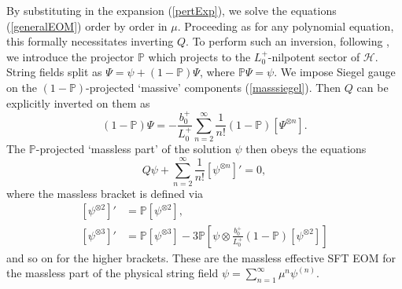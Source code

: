 \documentclass[12pt]{article}
\def\be{\begin{equation}}
\def\ee{\end{equation}}
\numberwithin{equation}{section}
\begin{document}
By substituting in the expansion (\ref{pertExp}), we solve the equations (\ref{generalEOM}) order by order in $\mu$. Proceeding as for any polynomial equation, this formally necessitates inverting $Q$. To perform such an inversion, following \cite{Erbin:2020eyc}, we introduce the projector $\mathbb{P}$ which projects to the $L_0^+$-nilpotent sector of $\mathcal{H}$. String fields split as $\Psi = \psi + (1-\mathbb{P})\Psi$, where $\mathbb{P} \Psi = \psi$. We impose Siegel gauge on the $(1-\mathbb{P})$-projected `massive' components (\ref{masssiegel}). Then $Q$ can be explicitly inverted on them as
\be\label{massivesf}
(1-\mathbb{P})\Psi = -\frac{b_0^+}{L_0^+}\sum\limits_{n=2}^\infty \frac{1}{n!}(1-\mathbb{P})[\Psi^{\otimes n}].
\ee
The $\mathbb{P}$-projected `massless part' of the solution $\psi$ then obeys the equations
\be\label{masslesseom}
Q \psi + \sum\limits_{n=2}^\infty \frac{1}{n!}[\psi^{\otimes n}]' = 0,
\ee
where the massless bracket is defined via
\be
\begin{aligned}
	[\psi^{\otimes 2}]' &= \mathbb{P}[\psi^{\otimes 2}], \\
	[\psi^{\otimes 3}]' &= \mathbb{P}[\psi^{\otimes 3}] - 3 \mathbb{P}\left[\psi \otimes \frac{b_0^+}{L_0^+}(1-\mathbb{P})[\psi^{\otimes 2}]\right]
    \label{masslessthree}
\end{aligned}
\ee
and so on for the higher brackets. These are the massless effective SFT EOM for the massless part of the physical string field $\psi = \sum_{n=1}^\infty \mu^n \psi^{(n)}$.
\end{document}
